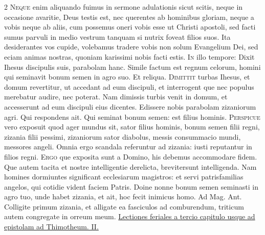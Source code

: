 \begin{multicols*}{2}
\lettrine[lines=2]{\zallmancaps \color{Blue} N}{eque} enim aliquando fuimus in sermone adulationis sicut scitis, neque in occasione avaritie, Deus testis est, nec querentes ab hominibus gloriam, neque a vobis neque ab aliis, cum possemus oneri vobis esse ut Christi apostoli, sed facti sumus parvuli in medio vestrum tanquam si nutrix foveat filios suos. Ita desiderantes vos cupide, volebamus tradere vobis non solum Evangelium Dei, sed eciam animas nostras, quoniam karissimi nobis facti estis.
\lettrine[lines=2]{\zallmancaps \color{Red} I}{n} illo tempore: Dixit Ihesus discipulis suis, parabolam hanc. Simile factum est regnum celorum, homini qui seminavit bonum semen in agro suo. Et reliqua.
\lettrine[lines=2]{\zallmancaps \color{Blue} D}{imittit} turbas Ihesus, et domum revertitur, ut accedant ad eum discipuli, et interrogent que nec populus merebatur
audire, nec poterat. Nam dimissis turbis venit in domum, et accesserunt ad eum discipuli eius dicentes. Edissere nobis parabolam zizaniorum agri. Qui respondens ait. Qui seminat bonum semen: est filius hominis.
\lettrine[lines=2]{\zallmancaps \color{Red} P}{erspicue} vero exposuit quod ager mundus sit, sator filius hominis, bonum semen filii regni, zizania filii pessimi, zizaniorum sator diabolus, messis consummacio mundi, messores angeli. Omnia ergo scandala referuntur ad zizania: iusti reputantur in filios regni.
\lettrine[lines=2]{\zallmancaps \color{Blue} E}{rgo} que exposita sunt a Domino, his debemus accommodare fidem. Que autem tacita et nostre intelligentie derelicta, brevitersunt intelligenda. Nam homines dormiuntes significant ecclesiarum magistros: et servi patrisfamilias angelos, qui cotidie vident faciem Patris.
 Doine nonne bonum semen seminasti in agro tuo, unde habet zizania, et ait, hoc fecit inimicus homo. {\color{Red} Ad Mag. Ant.} Colligite primum zizania, et alligate ea fasciculos ad comburendum, triticum autem congregate in orreum meum.
\newline \ul{Lectiones feriales a tercio capitulo usque ad epistolam ad Thimotheum. II.}
{\color{Red} }

\end{multicols*}
